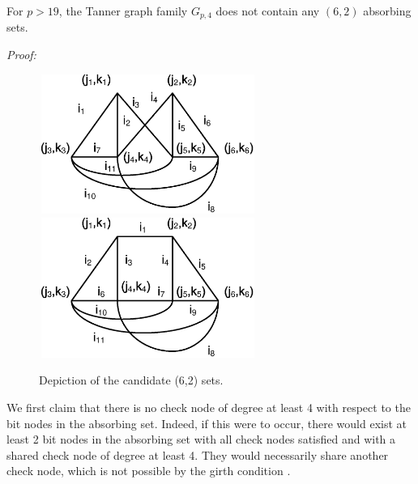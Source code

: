 \begin{lemma}\label{Lem4} For $p>19$, the Tanner graph family $G_{p,4}$ does not contain any $(6,2)$ absorbing sets.
\end{lemma}

\noindent \textit{Proof:}
\begin{figure}
\center\includegraphics[width=2.8in,height=1.8in]{Drawing30_2.eps}
\center\includegraphics[width=2.8in,height=1.8in]{Drawing32_1.eps}\hspace{0.3in}
\caption{Depiction of the candidate (6,2) sets.} \label{fig62}
\end{figure}
We first claim that there is no check node of degree at least 4 with
respect to the bit nodes in the absorbing set. Indeed, if this were
to occur, there would exist at least 2 bit nodes in the absorbing
set with all check nodes satisfied and with a shared check node of
degree at least 4. They would necessarily share another check node,
which is not possible by the girth condition \cite{fan}.

